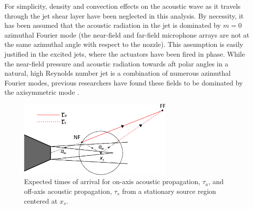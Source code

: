 For simplicity, density and convection effects on the acoustic wave as it travels through the jet shear layer have been neglected in this analysis. 
By necessity, it has been assumed that the acoustic radiation in the jet is dominated by $m = 0$ azimuthal Fourier mode (the near-field and far-field microphone arrays are not at the same azimuthal angle with respect to the nozzle). 
This assumption is easily justified in the excited jets, where the actuators have been fired in phase. 
While the near-field pressure and acoustic radiation towards aft polar angles in a natural, high Reynolds number jet is a combination of numerous azimuthal Fourier modes, previous researchers have found these fields to be dominated by the axisymmetric mode \citep{Arndt1997,Hall2006,Koenig2013,Juve1979}.
\begin{figure}
	\centering
	\includegraphics[width=3in]{Figures/ToA_tau.png}
	\caption{Expected times of arrival for on-axis acoustic propagation, $\tau_a$, and off-axis acoustic propagation, $\tau_s$ from a stationary source region centered at $x_s$.}
	\label{fig:ch3_ToA}
\end{figure}


